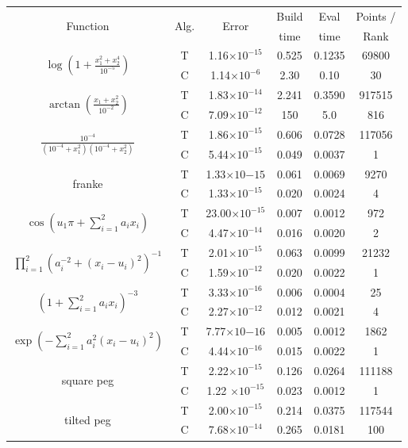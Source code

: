 \begin{table}[p]

  \begin{tabular}{c|c|c|c|c|c}
    \multirow{2}{*}{Function} & \multirow{2}{*}{Alg.} & \multirow{2}{*}{Error} & Build & Eval & Points /  \\
                            & &  & time & time & Rank  \\ \hline
    \multirow{2}{*}{$\log(1+\frac{x_1^2+x_2^4}{10^{-5}})$} &  T & 1.16$\times 10^{-15}$ &	0.525 &	0.1235 & 69800 \Tstrut  \\
                              & C & 1.14$\times 10^{-6}$ & 2.30 & 0.10 & 30 \\ \hline
    \multirow{2}{*}{$\arctan(\frac{x_1+x_2^2}{10^{-2}})$} & T & 1.83$\times 10^{-14}$ &	2.241 & 0.3590	& 917515 \Tstrut\\
                              & C & 7.09$\times 10^{-12}$ & 150 & 5.0 & 816 \\ \hline
    \multirow{2}{*}{$\frac{10^{-4}}{(10^{-4}+x_1^2)(10^{-4}+x_2^2)}$} & T & 1.86$\times 10^{-15}$ & 0.606 & 0.0728 & 	117056 \Tstrut\\
                              & C & 5.44$\times 10^{-15}$ & 0.049 & 0.0037 & 1 \\ \hline
    \multirow{2}{*}{franke} & T & 1.33$\times 10{-15}$ & 	0.061 &	0.0069 &	9270 \Tstrut\\
                              & C & 1.33$\times 10^{-15}$ & 0.020 & 0.0024 & 4 \\ \hline
    \multirow{2}{*}{$\cos(u_1\pi + \sum_{i=1}^2 a_i x_i)$} & T & 23.00$\times 10^{-15}$ &	0.007 &	0.0012 & 	972 \Tstrut\\
                              & C & 4.47$\times 10^{-14}$ & 0.016 & 0.0020 & 2 \\ \hline
    \multirow{2}{*}{$\prod_{i=1}^2 (a_i^{-2}+(x_i-u_i)^2)^{-1}$} & T & 2.01$\times 10^{-15}$ &	0.063 &	0.0099 & 21232 \Tstrut\\
                              & C & 1.59$\times 10^{-12}$ & 0.020 & 0.0022 & 1 \\ \hline
    \multirow{2}{*}{$(1+\sum_{i=1}^2 a_i x_i)^{-3}$} & T & 3.33$\times 10^{-16}$ &	0.006 &	0.0004 &	 25 \Tstrut\\
                              & C & 2.27$\times 10^{-12}$ & 0.012 & 0.0021 & 4 \\ \hline
    \multirow{2}{*}{$\exp(-\sum_{i=1}^2 a_i^2 (x_i-u_i)^2)$} & T & 7.77$\times 10{-16}$ & 0.005 &	0.0012 & 	1862 \Tstrut\\
                              & C & 4.44$\times 10^{-16}$ & 0.015 & 0.0022 & 1 \\  \hline
    \multirow{2}{*}{square peg} & T & 2.22$\times 10^{-15}$ & 0.126 &	0.0264 & 111188 \Tstrut\\
                              & C & 1.22 $\times 10^{-15}$ &	0.023 &	0.0012 & 	1 \\ \hline
    \multirow{2}{*}{tilted peg} & T & 2.00$\times 10^{-15}$ &	0.214 &	0.0375 & 117544 \Tstrut\\
                              & C & 7.68$\times 10^{-14}$ & 0.265 & 	0.0181 & 100
                              

\end{tabular}
\end{table}
